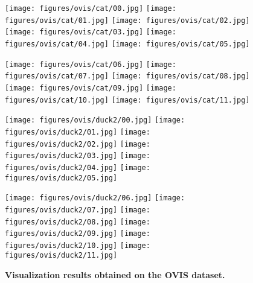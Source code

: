 \documentclass[10pt,twocolumn,letterpaper]{article}
\begin{document}
\begin{figure*}[t]
\begin{minipage}[c]{1.00\linewidth}
\texttt{[image: figures/ovis/cat/00.jpg]}
\texttt{[image: figures/ovis/cat/01.jpg]}
\texttt{[image: figures/ovis/cat/02.jpg]}
\texttt{[image: figures/ovis/cat/03.jpg]}
\texttt{[image: figures/ovis/cat/04.jpg]}
\texttt{[image: figures/ovis/cat/05.jpg]}
\end{minipage}\hfill
\begin{minipage}[c]{1.0\linewidth}
\texttt{[image: figures/ovis/cat/06.jpg]}
\texttt{[image: figures/ovis/cat/07.jpg]}
\texttt{[image: figures/ovis/cat/08.jpg]}
\texttt{[image: figures/ovis/cat/09.jpg]}
\texttt{[image: figures/ovis/cat/10.jpg]}
\texttt{[image: figures/ovis/cat/11.jpg]}
\end{minipage}\hfill\vspace{1mm}

\begin{minipage}[c]{1.00\linewidth}
\texttt{[image: figures/ovis/duck2/00.jpg]}
\texttt{[image: figures/ovis/duck2/01.jpg]}
\texttt{[image: figures/ovis/duck2/02.jpg]}
\texttt{[image: figures/ovis/duck2/03.jpg]}
\texttt{[image: figures/ovis/duck2/04.jpg]}
\texttt{[image: figures/ovis/duck2/05.jpg]}
\end{minipage}\hfill
\begin{minipage}[c]{1.0\linewidth}
\texttt{[image: figures/ovis/duck2/06.jpg]}
\texttt{[image: figures/ovis/duck2/07.jpg]}
\texttt{[image: figures/ovis/duck2/08.jpg]}
\texttt{[image: figures/ovis/duck2/09.jpg]}
\texttt{[image: figures/ovis/duck2/10.jpg]}
\texttt{[image: figures/ovis/duck2/11.jpg]}
\end{minipage}\hfill\vspace{1mm}

\caption{\textbf{Visualization results obtained on the OVIS dataset.}}
\label{fig:ovis demo}
\end{figure*}
\end{document}
